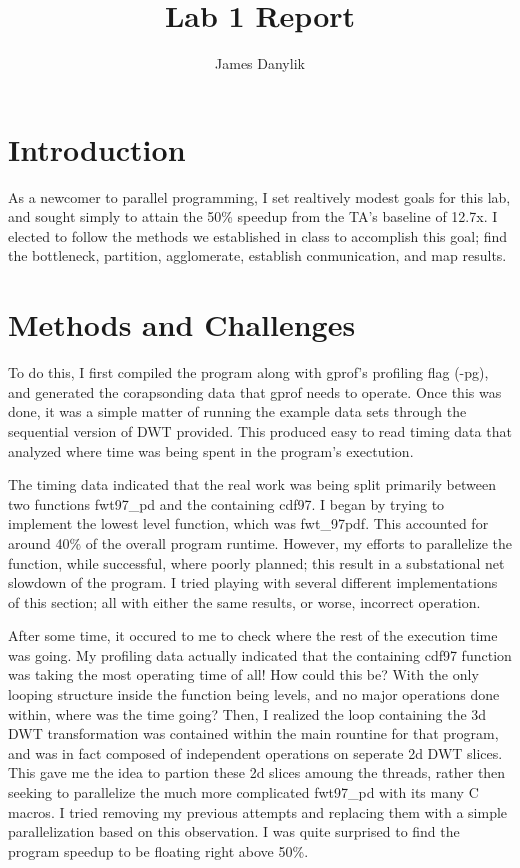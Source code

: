 \documentclass[a4paper,10pt]{report}
\title{Lab 1 Report}
\author{James Danylik}
\begin{document}
\maketitle

\section{Introduction}
 As a newcomer to parallel programming, I set realtively modest goals for this lab, and sought simply to attain the 50\% speedup from the TA's baseline of 12.7x. I elected to follow the methods we established in class to accomplish this goal; find the bottleneck, partition, 
 agglomerate, establish conmunication, and map results.

\section{Methods and Challenges}
To do this, I first compiled the program along with gprof's profiling flag (-pg), and generated the corapsonding data that gprof needs to operate.
Once this was done, it was a simple matter of running the example data sets through the sequential version of DWT provided.  This produced
easy to read timing data that analyzed where time was being spent in the program's exectution.

The timing data indicated that the real work was being split primarily between two functions fwt97\_pd and the containing cdf97.  I began by trying
to implement the lowest level function, which was fwt\_97pdf.  This accounted for around 40\% of the overall program runtime.  However, my efforts
to parallelize the function, while successful, where poorly planned; this result in a substational net slowdown of the program.  I tried playing
with several different implementations of this section; all with either the same results, or worse, incorrect operation.  

After some time, it occured to me to check where the rest of the execution time was going.  My profiling data actually indicated that the containing
cdf97 function was taking the most operating time of all!  How could this be?  With the only looping structure inside the function being levels,
and no major operations done within, where was the time going?  Then, I realized the loop containing the 3d DWT transformation was contained within
the main rountine for that program, and was in fact composed of independent operations on seperate 2d DWT slices.  This gave me the idea to partion these
2d slices amoung the threads, rather then seeking to parallelize the much more complicated fwt97\_pd with its many C macros.  I tried removing my 
previous attempts and replacing them with a simple parallelization based on this observation.  I was quite surprised to find the program speedup to
be floating right above 50\%.
\end{document}
